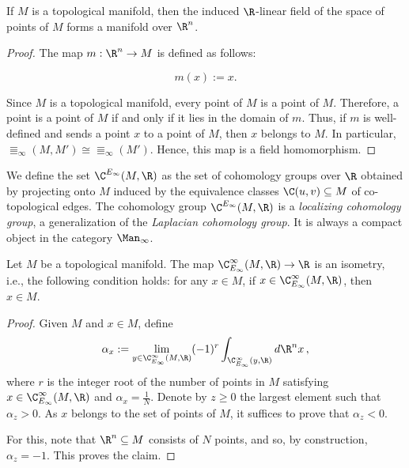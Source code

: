 \documentclass[a4paper,reqno,oneside]{article}
\begin{document}
\begin{lemma}
    If $M$ is a topological manifold, then the induced $\R$-linear field of the space of points of $M$ forms a manifold over $\R^n$.
\end{lemma}

\begin{proof}
    The map $m: \R^n \to M$ is defined as follows:

    \[
        m(x) := x.
    \]

    Since $M$ is a topological manifold, every point of $M$ is a point of $M$. Therefore, a point is a point of $M$ if and only if it lies in the domain of $m$. Thus, if $m$ is well-defined and sends a point $x$ to a point of $M$, then $x$ belongs to $M$. In particular, $\Equiv_{\infty}(M, M') \cong \Equiv_{\infty}(M')$. Hence, this map is a field homomorphism.
\end{proof}

We define the set $\C^{E_\infty}(M, \R)$ as the set of cohomology groups over $\R$ obtained by projecting onto $M$ induced by the equivalence classes $\C(u,v) \subseteq M$ of co-topological edges. The cohomology group $\C^{E_\infty}(M, \R)$ is a {\em localizing cohomology group}, a generalization of the {\em Laplacian cohomology group}. It is always a compact object in the category $\Man_{\infty}$.

\begin{proposition}\label{prop:localizing_cohomology_group}
    Let $M$ be a topological manifold. The map $\C^{\infty}_{E_\infty}(M, \R) \to \R$ is an isometry, i.e., the following condition holds: for any $x \in M$, if $x \in \C^{\infty}_{E_\infty}(M, \R)$, then $x \in M$.
\end{proposition}

\begin{proof}
    Given $M$ and $x \in M$, define
    \[
        \alpha_x := \lim_{y \in \C^{\infty}_{E_\infty}(M, \R)} (-1)^r \int_{\C^{\infty}_{E_\infty}(y, \R)} d\R^nx \,,
    \]
    where $r$ is the integer root of the number of points in $M$ satisfying $x \in \C^{\infty}_{E_\infty}(M, \R)$ and $\alpha_x = \frac{1}{N}$. Denote by $z \geq 0$ the largest element such that $\alpha_z > 0$. As $x$ belongs to the set of points of $M$, it suffices to prove that $\alpha_z < 0$.

    For this, note that $\R^n \subseteq M$ consists of $N$ points, and so, by construction, $\alpha_z = -1$. This proves the claim.
\end{proof}
\end{document}
